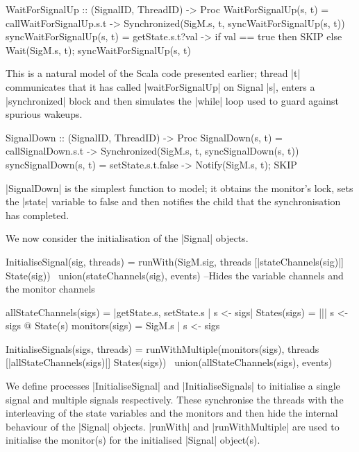 \begin{cspm}[caption={The CSP model of the {\scalastyle waitForSignalUp} function of the {\scalastyle Signal} object}]
WaitForSignalUp :: (SignalID, ThreadID) -> Proc  
WaitForSignalUp(s, t) = 
  callWaitForSignalUp.s.t -> Synchronized(SigM.s, t, syncWaitForSignalUp(s, t))        
syncWaitForSignalUp(s, t) = 
  getState.s.t?val -> if val == true then  SKIP 
                      else Wait(SigM.s, t); syncWaitForSignalUp(s, t)
\end{cspm}

This is a natural model of the Scala code presented earlier; thread |t| communicates that it has called |waitForSignalUp| on Signal |s|, enters a |synchronized| block and then simulates the \inlineScala|while| \inlineCSP loop used to guard against spurious wakeups.

\begin{cspm}[caption={The CSP model of the {\scalastyle signalDown} function of the {\scalastyle Signal} object}]
SignalDown :: (SignalID, ThreadID) -> Proc
SignalDown(s, t) = callSignalDown.s.t -> Synchronized(SigM.s, t, syncSignalDown(s, t))
syncSignalDown(s, t) = setState.s.t.false -> Notify(SigM.s, t); SKIP
\end{cspm}

|SignalDown| is the simplest function to model; it obtains the monitor's lock, sets the |state| variable to false and then notifies the child that the synchronisation has completed.

We now consider the initialisation of the |Signal| objects.

\begin{cspm}[caption={The initialisation of the {\scalastyle Signal} objects}]
InitialiseSignal(sig, threads) = 
  runWith(SigM.sig, threads [|stateChannels(sig)|] State(sig)) 
      \ union(stateChannels(sig), events) --Hides the variable channels and the monitor channels

allStateChannels(sigs) = {|getState.s, setState.s | s <- sigs|}
States(sigs) = ||| s <- sigs @ State(s)
monitors(sigs) = {SigM.s | s <- sigs}

InitialiseSignals(sigs, threads) = 
  runWithMultiple(monitors(sigs), threads [|allStateChannels(sigs)|] States(sigs))  
      \ union(allStateChannels(sigs), events)
\end{cspm}

We define processes |InitialiseSignal| and |InitialiseSignals| to initialise a single signal and multiple signals respectively. These synchronise the threads with the interleaving of the state variables and the monitors and then hide the internal behaviour of the |Signal| objects. |runWith| and |runWithMultiple| are used to initialise the monitor(s) for the initialised |Signal| object(s).

